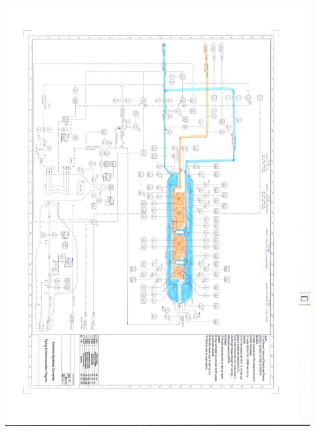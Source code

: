 \documentclass[a4paper,oneside,12pt]{article}
\begin{document}
\begin{center}
\includegraphics[scale=0.7]{001.jpg}


\end{center}
\end{document}
